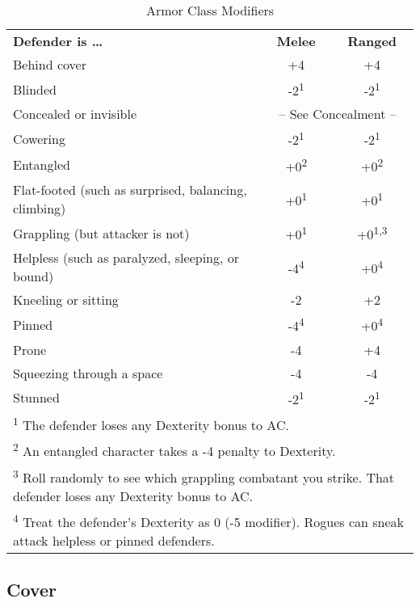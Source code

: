 \begin{table}[htb]
\mcinherit
\caption{Armor Class Modifiers}
\centering
\begin{tabular}{p{8.5cm}cc}
\textbf{Defender is \ldots{}} & \textbf{Melee} & \textbf{Ranged}\\
Behind cover & +4 & +4\\
Blinded & -2\textsuperscript{1} & -2\textsuperscript{1}\\
Concealed or invisible & \multicolumn{2}{c}{-- See Concealment --}\\
Cowering & -2\textsuperscript{1} & -2\textsuperscript{1}\\
Entangled & +0\textsuperscript{2} & +0\textsuperscript{2}\\
Flat-footed (such as surprised, balancing, climbing) & +0\textsuperscript{1} & +0\textsuperscript{1}\\
Grappling (but attacker is not) & +0\textsuperscript{1} & +0\textsuperscript{1,3}\\
Helpless (such as paralyzed, sleeping, or bound) & -4\textsuperscript{4} & +0\textsuperscript{4}\\
Kneeling or sitting & -2 & +2\\
Pinned & -4\textsuperscript{4} & +0\textsuperscript{4}\\
Prone & -4 & +4\\
Squeezing through a space & -4 & -4\\
Stunned & -2\textsuperscript{1} & -2\textsuperscript{1}\\
\multicolumn{3}{p{12cm}}{\textsuperscript{1} The defender loses any Dexterity bonus to AC.}\\
\multicolumn{3}{p{12cm}}{\textsuperscript{2} An entangled character takes a -4 penalty to Dexterity.}\\
\multicolumn{3}{p{12cm}}{\textsuperscript{3} Roll randomly to see which grappling combatant you strike. That defender loses any Dexterity bonus to AC.}\\
\multicolumn{3}{p{12cm}}{\textsuperscript{4} Treat the defender's Dexterity as 0 (-5 modifier). Rogues can sneak attack helpless or pinned defenders.}\\
\end{tabular}
\end{table}

\subsection{Cover}

